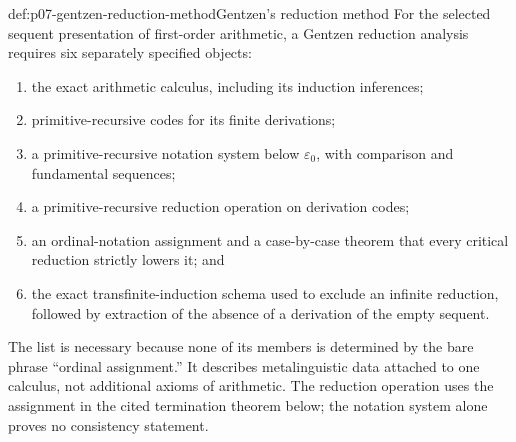 \begin{hbmethod}{def:p07-gentzen-reduction-method}{Gentzen's reduction method}
For the selected sequent presentation of first-order arithmetic, a Gentzen
reduction analysis requires six separately specified objects:
\begin{enumerate}
  \item the exact arithmetic calculus, including its induction inferences;
  \item primitive-recursive codes for its finite derivations;
  \item a primitive-recursive notation system below \(\varepsilon_0\), with
        comparison and fundamental sequences;
  \item a primitive-recursive reduction operation on derivation codes;
  \item an ordinal-notation assignment and a case-by-case theorem that every
        critical reduction strictly lowers it; and
  \item the exact transfinite-induction schema used to exclude an infinite
        reduction, followed by extraction of the absence of a derivation of
        the empty sequent.
\end{enumerate}
The list is necessary because none of its members is determined by the bare
phrase ``ordinal assignment.''  It describes metalinguistic data attached to
one calculus, not additional axioms of arithmetic.  The reduction operation
uses the assignment in the cited termination theorem below; the notation
system alone proves no consistency statement.
\end{hbmethod}

